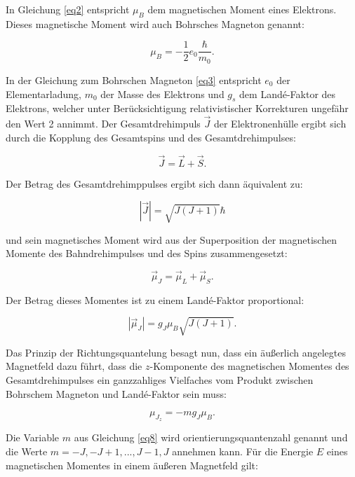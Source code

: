 In Gleichung \ref{eq2} entspricht $\mu_B$ dem magnetischen Moment eines Elektrons. 
Dieses magnetische Moment wird auch Bohrsches Magneton genannt:

\begin{equation}
    \mu_B = - \frac{1}{2}e_0\frac{\hbar}{m_0}.
    \label{eq3}
\end{equation}

In der Gleichung zum Bohrschen Magneton \ref{eq3} entspricht $e_0$ der 
Elementarladung, $m_0$ der Masse des Elektrons und $g_s$ dem Landé-Faktor
des Elektrons, welcher unter Berücksichtigung relativistischer Korrekturen 
ungefähr den Wert 2 annimmt.
Der Gesamtdrehimpuls $\vec{J}$ der Elektronenhülle ergibt sich durch die 
Kopplung des Gesamtspins und des Gesamtdrehimpulses:

\begin{equation}
    \vec{J} = \vec{L} + \vec{S}.
    \label{eq4}
\end{equation}

Der Betrag des Gesamtdrehimppulses ergibt sich dann äquivalent zu:

\begin{equation}
    |\vec{J}| = \sqrt{J(J+1)}\hbar
    \label{eq5}
\end{equation}

und sein magnetisches Moment wird aus der Superposition der magnetischen Momente des
Bahndrehimpulses und des Spins zusammengesetzt:

\begin{equation}
    \vec{\mu}_J = \vec{\mu}_L + \vec{\mu}_S.
    \label{eq6}
\end{equation}

Der Betrag dieses Momentes ist zu einem Landé-Faktor proportional:

\begin{equation}
    |\vec{\mu}_J| = g_J \mu_B\sqrt{J(J+1)}.
    \label{eq7}
\end{equation}

Das Prinzip der Richtungsquantelung besagt nun, dass ein äußerlich angelegtes 
Magnetfeld dazu führt, dass die $z$-Komponente des magnetischen Momentes des 
Gesamtdrehimpulses ein ganzzahliges Vielfaches vom Produkt zwischen 
Bohrschem Magneton und Landé-Faktor sein muss:

\begin{equation}
    \mu_{J_z} = -m g_J \mu_B.
    \label{eq8}
\end{equation}

Die Variable $m$ aus Gleichung \ref{eq8} wird orientierungsquantenzahl genannt und 
die Werte $m = -J, -J+1, ... , J-1,J$ annehmen kann. Für die Energie $E$ eines 
magnetischen Momentes in einem äußeren Magnetfeld gilt:


